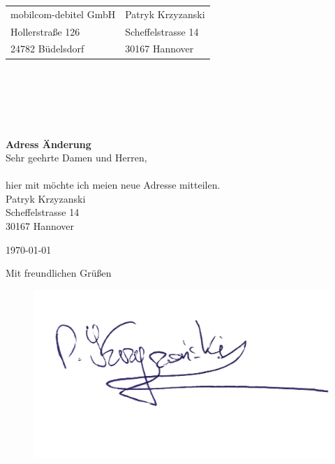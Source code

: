 \documentclass{letter}
\begin{document}
\begin{letter}{}
\begin{tabular}{@{}p{3.0in}l}
mobilcom-debitel GmbH& Patryk Krzyzanski\\
Hollerstraße 126& Scheffelstrasse 14\\
24782 Büdelsdorf& 30167 Hannover\\
\end{tabular}\\ \\ \\ \\
\bigskip
\\
\Large\textbf{Adress Änderung}\\
\bigskip
\normalsize
Sehr geehrte Damen und Herren, \\\\

hier mit möchte ich meien neue Adresse mitteilen. 
\\

Patryk Krzyzanski\\
Scheffelstrasse 14\\
30167 Hannover\\
\bigskip

\today
 
\closing{Mit freundlichen Grüßen}
\begin{figure}
  \includegraphics[width=0.5\linewidth]{podpis.jpg}
\end{figure}



\end{letter}
\end{document}
